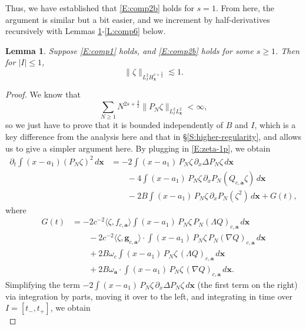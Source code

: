 \documentclass[12pt,letterpaper]{amsart}
\newcommand{\la}{\langle}
\newcommand{\ra}{\rangle}
\newtheorem{lemma}[theorem]{Lemma}
\theoremstyle{remark}
\numberwithin{equation}{section}
\numberwithin{theorem}{section}
\numberwithin{table}{section}
\begin{document}
Thus, we have established that \eqref{E:comp2b} holds for $s=1$.    From here, the argument is similar but a bit easier, and we increment by half-derivatives recursively with Lemmas \ref{L:comp5}-\ref{L:comp6} below.

\begin{lemma}
\label{L:comp5}
Suppose  \eqref{E:comp1} holds, and \eqref{E:comp2b} holds for some $s\geq 1$.   Then for $|I|\leq 1$, 
\begin{equation}
\label{E:comp7}
\| \zeta \|_{L_I^2 H_{\mathbf{x}}^{s+\frac34}} \lesssim 1.
\end{equation}
\end{lemma}

\begin{proof}
We  know that 
$$
\sum_{N\geq 1} N^{2s+\frac32} \| P_N \zeta \|_{L_I^2 L_{\mathbf{x}}^2}  < \infty,
$$
so we just have to prove that it is bounded independently of $B$ and $I$, which is a key difference from the analysis here and that in \S \ref{S:higher-regularity}, and allows us to give a simpler argument here.  
By plugging in \eqref{E:zeta-1p}, we obtain
\begin{align*}
\partial_t \int (x-a_1) (P_N \zeta)^2 \, d\mathbf{x} 
&= -2 \int (x-a_1) \, P_N \zeta \, \partial_x \Delta P_N \zeta \, d\mathbf{x} \\
& \qquad - 4 \int (x-a_1) \, P_N \zeta \, \partial_x P_N ( Q_{c,\mathbf{a}} \zeta) \, d\mathbf{x} \\
& \qquad - 2 B \int (x-a_1) \, P_N \zeta \, \partial_x P_N ( \zeta^2) \, d \mathbf{x} + G(t),
\end{align*}
where
\begin{align*}
G(t) &= -2 c^{-2} \la \zeta, f_{c,\mathbf{a}}\ra  \int (x-a_1) \, P_N \zeta \, P_N (\Lambda Q)_{c,\mathbf{a}} \, d\mathbf{x} \\
& \qquad -2 c^{-2} \la \zeta, \mathbf{g}_{c,\mathbf{a}} \ra  \cdot  \int (x-a_1) \, P_N \zeta \, P_N (\nabla Q)_{c,\mathbf{a}} \, d\mathbf{x}  \\
& \qquad + 2B \omega_c \int (x-a_1) \, P_N\zeta \, ( \Lambda Q)_{c,\mathbf{a}} \, d\mathbf{x} \\
& \qquad + 2B \omega_{\mathbf{a}} \cdot \int (x-a_1) \, P_N \zeta \, (\nabla Q)_{c,\mathbf{a}} \, d \mathbf{x}.
\end{align*}
Simplifying the term $-2 \int (x-a_1) \, P_N \zeta \, \partial_x \Delta P_N \zeta \, d\mathbf{x}$ (the first term on the right) via integration by parts, moving it over to the left, and integrating in time over $I=[t_-,t_+]$, we obtain
$$
$$
\end{proof}
\end{document}
